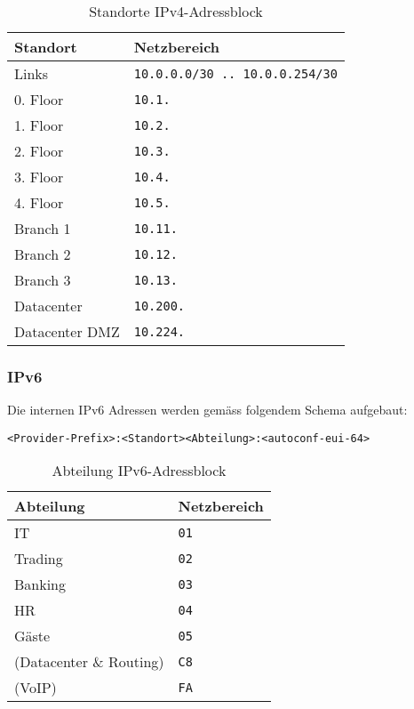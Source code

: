 \begin{table}[h]
	\centering
	\begin{tabu}{l l}
		\toprule
		Standort & Netzbereich \\
		\midrule
		Links & \lstinline|10.0.0.0/30 .. 10.0.0.254/30| \\
		0. Floor & \lstinline|10.1.| \\
		1. Floor & \lstinline|10.2.| \\
		2. Floor & \lstinline|10.3.| \\
		3. Floor & \lstinline|10.4.| \\
		4. Floor & \lstinline|10.5.| \\
		Branch 1 & \lstinline|10.11.| \\
		Branch 2 & \lstinline|10.12.| \\
		Branch 3 & \lstinline|10.13.| \\
		Datacenter & \lstinline|10.200.| \\
		Datacenter DMZ & \lstinline|10.224.| \\
		\bottomrule
	\end{tabu}
	\caption{Standorte IPv4-Adressblock}
\end{table}

\subsubsection{IPv6}

Die internen IPv6 Adressen werden gemäss folgendem Schema aufgebaut: 

\lstinline|<Provider-Prefix>:<Standort><Abteilung>:<autoconf-eui-64>|

\begin{table}[h]
	\centering
	\begin{tabu}{l l}
		\toprule 
		Abteilung & Netzbereich \\
		\midrule
		IT & \lstinline|01|\\
		Trading & \lstinline|02| \\
		Banking & \lstinline|03|\\
		HR & \lstinline|04|\\
		Gäste & \lstinline|05|\\
		(Datacenter \& Routing) & \lstinline|C8|\\
		(VoIP) & \lstinline|FA|\\
		\bottomrule
	\end{tabu}
	  \label{tbl:abteilung_ipv6_adressblock}
	\caption{Abteilung IPv6-Adressblock}
\end{table}


